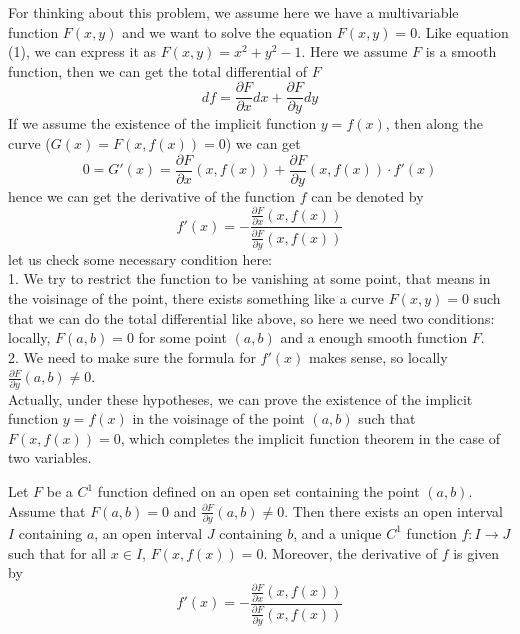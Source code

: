 \documentclass[12pt,a4paper]{article}
\begin{document}
For thinking about this problem, we assume here we have a multivariable function \(F(x,y)\) and we want to solve the equation \(F(x,y)=0\). Like equation (1), we can express it as \(F(x,y) = x^2+y^2-1\). Here we assume \(F\) is a smooth function, then we can get the total differential of \(F\)
\[df = \frac{\partial F}{\partial x}dx + \frac{\partial F}{\partial y}dy\]
If we assume the existence of the implicit function \(y=f(x)\), then along the curve (\(G(x) = F(x,f(x)) = 0\)) we can get
\[0 = G'(x) =  \frac{\partial F}{\partial x}(x,f(x)) + \frac{\partial F}{\partial y}(x,f(x))\cdot f'(x) \]
hence we can get the derivative of the function \(f\) can be denoted by
\[f'(x) = -\frac{\frac{\partial F}{\partial x}(x,f(x))}{\frac{\partial F}{\partial y}(x,f(x))}\]
let us check some necessary condition here:\\
1. We try to restrict the function to be vanishing at some point, that means in the voisinage of the point, there exists something like a curve \(F(x,y)=0\) such that we can do the total differential like above, so here we need two conditions: locally, \(F(a,b) = 0\) for some point \((a,b)\) and a enough smooth function \(F\).\\
2. We need to make sure the formula for \(f'(x)\) makes sense, so locally \(\frac{\partial F}{\partial y}(a,b) \neq 0\).\\

Actually, under these hypotheses, we can prove the existence of the implicit function \(y= f(x)\) in the voisinage of the point \((a,b)\) such that \(F(x,f(x))=0\), which completes the implicit function theorem in the case of two variables.\\

\begin{theorem}
Let \(F\) be a \(C^1\) function defined on an open set containing the point \((a,b)\). Assume that \(F(a,b) = 0\) and \(\frac{\partial F}{\partial y}(a,b) \neq 0\). Then there exists an open interval \(I\) containing \(a\), an open interval \(J\) containing \(b\), and a unique \(C^1\) function \(f: I \to J\) such that for all \(x \in I\), \(F(x, f(x)) = 0\). Moreover, the derivative of \(f\) is given by
\[f'(x) = -\frac{\frac{\partial F}{\partial x}(x,f(x))}{\frac{\partial F}{\partial y}(x,f(x))}\]
\end{theorem}
\end{document}
